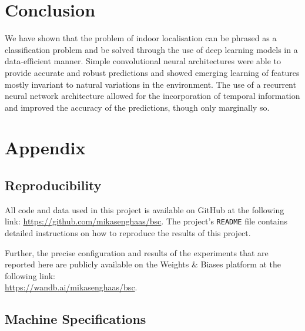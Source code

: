 \documentclass[a4paper]{article}
\begin{document}

  \section{Conclusion} %
  \label{sec:conclusion}

  We have shown that the problem of indoor localisation can be phrased as a
  classification problem and be solved through the use of deep learning models
  in a data-efficient manner.
  Simple convolutional neural architectures were able to provide accurate and
  robust predictions and showed emerging learning of features mostly invariant
  to natural variations in the environment.
  The use of a recurrent neural network architecture allowed for the
  incorporation of temporal information and improved the accuracy of the
  predictions, though only marginally so.


  \newpage
  
  


  \newpage
  \section{Appendix} %
  \label{sec:appendix}

  \subsection{Reproducibility} %
  \label{sub:reproducibility}

  All code and data used in this project is available on GitHub at the
  following link: \url{https://github.com/mikasenghaas/bsc}. The project's 
  \texttt{README} file contains detailed instructions on how to reproduce the
  results of this project.

  Further, the precise configuration and results of the experiments that are
  reported here are publicly available on the Weights \& Biases platform at the
  following link:\\
  \url{https://wandb.ai/mikasenghaas/bsc}.


  \subsection{Machine Specifications} %
  \label{sub:machine-specs}
\end{document}
